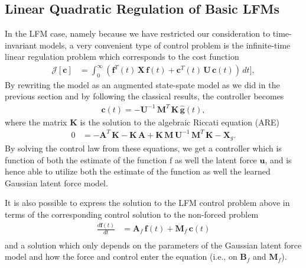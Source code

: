 \documentclass[journal]{IEEEtran}
\begin{document}
\subsection{Linear Quadratic Regulation of Basic LFMs}
%
In the LFM case, namely because we have restricted our consideration to time-invariant models, a very convenient type of control problem is the infinite-time linear regulation problem which corresponds to the cost function
%
\begin{equation}
\begin{split}
  \mathcal{J}[\mathbf{c}] &= \int_0^\infty
   (\mathbf{f}^T(t) \, \mathbf{X} \, \mathbf{f}(t)
  + \mathbf{c}^T(t) \, \mathbf{U} \, \mathbf{c}(t)) \, dt \Big],
\end{split}
\end{equation}
%
By rewriting the model as an augmented state-spate model as we did in the previous section and by following the classical results, the controller becomes
%
\begin{equation}
\begin{split}
  \mathbf{c}(t) = - \mathbf{U}^{-1} \, \mathbf{M}^T \, \mathbf{K}\, \hat{\mathbf{g}}(t),
\end{split}
\label{eq:joint_control}
\end{equation}
%
where the matrix $\mathbf{K}$ is the solution to the algebraic Riccati equation (ARE) 
%
\begin{equation}
\begin{split}
  0 &=
    -\mathbf{A}^T \, \mathbf{K} - \mathbf{K} \, \mathbf{A} 
  +  \mathbf{K} \, \mathbf{M} \, \mathbf{U}^{-1} \,
   \mathbf{M}^T \, \mathbf{K} - \mathbf{X}_g.
\end{split}
\label{eq:joint_are}
\end{equation}
%
By solving the control law from these equations, we get a controller which is function of both the estimate of the function $\mathrm{f}$ as well the latent force $\mathbf{u}$, and is hence able to utilize both the estimate of the function as well the learned Gaussian latent force model.

It is also possible to express the solution to the LFM control problem above in terms of the corresponding control solution to the non-forced problem
%
\begin{equation}
\begin{split}
  \frac{d\mathbf{f}(t)}{dt}
  &= \mathbf{A}_f \, \mathbf{f}(t) + \mathbf{M}_f \, \mathbf{c}(t) \\
\end{split}
\end{equation}
%
and a solution which only depends on the parameters of the Gaussian latent force model and how the force and control enter the equation (i.e., on $\mathbf{B}_f$ and $\mathbf{M}_f$).
\end{document}
